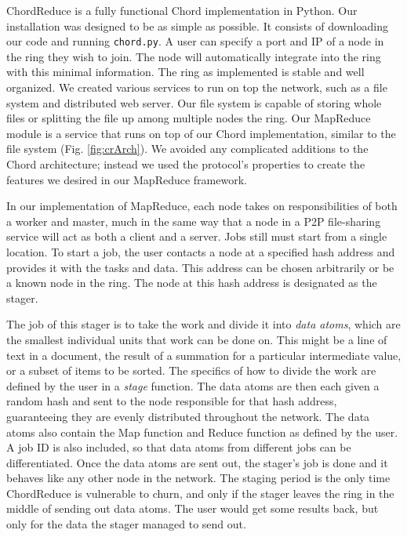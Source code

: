 ChordReduce is a fully functional Chord implementation in Python.  Our installation was designed to be as simple as possible.  It consists of downloading our code \cite{chordreduce-code} and running \texttt{chord.py}.  A user can specify a port and IP of a node in the ring they wish to join.  The node will automatically integrate into the ring with this minimal information.  The ring as implemented is stable and well organized.  We created various services to run on top the network, such as a file system and distributed web server.  Our file system is capable of storing whole files or splitting the file up among multiple nodes the ring.  Our MapReduce module is a service that runs on top of our Chord implementation, similar to the file system (Fig. \ref{fig:crArch}).  We avoided any complicated additions to the Chord architecture; instead we used the protocol's properties to create the features we desired in our MapReduce framework. 

In our implementation of MapReduce, each node takes on responsibilities of both a worker and master, much in the same way that a node in a P2P file-sharing service will act as both a client and a server.  Jobs still must start from a single location.  To start a job, the user contacts a node at a specified hash address and provides it with the tasks and data.  This address can be chosen arbitrarily or be a known node in the ring. The node at this hash address is designated as the stager.  

The job of this stager is to take the work and divide it into \emph{data atoms}, which are the smallest individual units that work can be done on.  This might be a line of text in a document, the result of a summation for a particular intermediate value, or a subset of items to be sorted.  The specifics of how to divide the work are defined by the user in a \emph{stage} function.  The data atoms are then each given a random hash and sent to the node responsible for that hash address, guaranteeing they are evenly distributed throughout the network.  The data atoms also contain the Map function and Reduce function as defined by the user.  A job ID is also included, so that data atoms from different jobs can be differentiated.  Once the data atoms are sent out, the stager's job is done and it behaves like any other node in the network. The staging period is the only time ChordReduce is vulnerable to churn, and only if the stager leaves the ring in the middle of sending out data atoms.  The user would get some results back, but only for the data the stager managed to send out.

